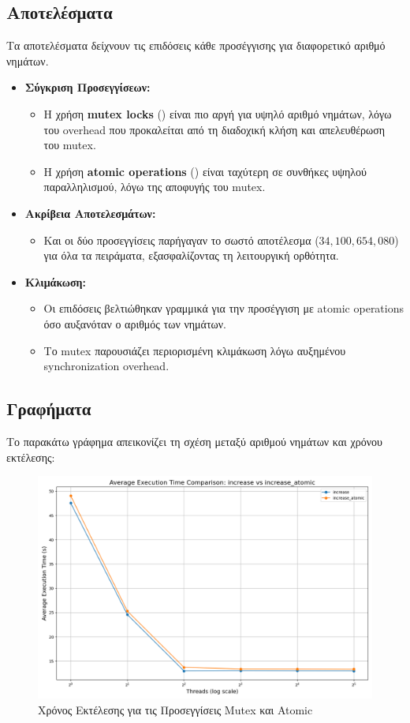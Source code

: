\documentclass{article}
\begin{document}
\subsection*{Αποτελέσματα}
Τα αποτελέσματα δείχνουν τις επιδόσεις κάθε προσέγγισης για διαφορετικό αριθμό νημάτων.
\begin{itemize} 
    \item \textbf{Σύγκριση Προσεγγίσεων:} 
    \begin{itemize} 
        \item Η χρήση \textbf{mutex locks} () είναι πιο αργή για υψηλό αριθμό νημάτων, λόγω του overhead που προκαλείται από τη διαδοχική κλήση και απελευθέρωση του mutex. 
        \item Η χρήση \textbf{atomic operations} () είναι ταχύτερη σε συνθήκες υψηλού παραλληλισμού, λόγω της αποφυγής του mutex. 
    \end{itemize} 
    \item \textbf{Ακρίβεια Αποτελεσμάτων:} 
    \begin{itemize} 
        \item Και οι δύο προσεγγίσεις παρήγαγαν το σωστό αποτέλεσμα ($34,100,654,080$) για όλα τα πειράματα, εξασφαλίζοντας τη λειτουργική ορθότητα. 
    \end{itemize} 
    \item \textbf{Κλιμάκωση:} 
    \begin{itemize} 
        \item Οι επιδόσεις βελτιώθηκαν γραμμικά για την προσέγγιση με atomic operations όσο αυξανόταν ο αριθμός των νημάτων. 
        \item Το mutex παρουσιάζει περιορισμένη κλιμάκωση λόγω αυξημένου synchronization overhead. 
    \end{itemize} 
\end{itemize}
\subsection*{Γραφήματα}
Το παρακάτω γράφημα απεικονίζει τη σχέση μεταξύ αριθμού νημάτων και χρόνου εκτέλεσης:
\begin{figure}[h] 
    \centering 
    \includegraphics[width=1\textwidth]{increase_results.png} 
    \caption{Χρόνος Εκτέλεσης για τις Προσεγγίσεις Mutex και Atomic} 
\end{figure}
\end{document}

